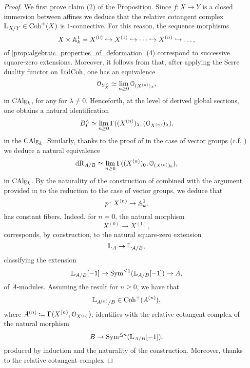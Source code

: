 \documentclass[10pt,a4paper,reqno]{amsart} %
\theoremstyle{plain}
\theoremstyle{definition}
\theoremstyle{remark}
\numberwithin{equation}{section}
\begin{document}
\begin{proof} We first prove claim (2) of the Proposition.
    Since $f \colon X \to Y$ is a closed immersion between affines we deduce that the relative cotangent complex $\mathbb L_{X/ Y} \in \mathrm{Coh}^+(X)$ is $1$-connective.
    For this reason, the sequence morphisms
        \[
            X \times \mathbb A^1_k = X^{(0)} \hookrightarrow X^{(1)} \hookrightarrow \dots \hookrightarrow X^{(n)} \hookrightarrow \dots,  
        \]
    of \cref{prop:algebraic_properties_of_deformation} (4) correspond to successive square-zero extensions.
    Moreover,
    it follows from \cite[Corollary 9.5.2.5]{Gaitsgory_Study_II} that, after applying the Serre duality functor on $\mathrm{Ind}\mathrm{Coh}$, one has an equivalence
        \[
            \mathcal O_{Y^\wedge_X} \simeq \lim_{n \ge 0} \mathcal O_{(X^{(n)})_\lambda},  
        \]
    in $\mathrm{CAlg}_k$, for any
    for $\lambda \neq 0$. Henceforth,
    at the level of derived global sections, one obtains a natural identification   
        \[
            B^\wedge_I \simeq \lim_{n \ge 0} \Gamma((X^{(n)})_\lambda, (\mathcal O_{X^{(n)}})_\lambda),  
        \]
    in the \infcat $\mathrm{CAlg}_k$. Similarly, thanks to
    the proof of \cite[\S 9, Theorem 5.1.3]{Gaitsgory_Study_II} in the case of vector groups (c.f. \cite[\S 9.5.5]{Gaitsgory_Study_II})
    we deduce a natural equivalence
        \[
            \mathrm{dR}_{A/ B} \simeq \lim_{n \ge 0}\Gamma((X^{(n)})_0, \mathcal O_{(X^{(n)})_0}),
        \]
    in $\mathrm{CAlg}_k$. By the naturality of the construction of \cite[\S 9.5.1]{Gaitsgory_Study_II} combined with the argument provided in \cite[\S 9.5.5]{Gaitsgory_Study_II} to the reduction to the case of vector groups,
    we deduce that
        \[
            p \colon X^{(n)} \to   \mathbb A^1_k,
        \]
    has constant fibers. Indeed, for $n = 0$, the natural morphism
        \[
            X^{(0)} \to X^{(1)},  
        \]
    corresponds, by construction, to the natural square-zero extension
        \[
            \mathbb L_A \to \mathbb L_{A/ B} ,  
        \]
    classifying the extension
        \[
            \mathbb L_{A/ B}[-1] \to \operatorname{Sym}^{\le 1}(\mathbb L_{A/ B}[-1])  \to A,
        \]
    of $A$-modules.
    Assuming the result for $n \ge 0$, we have that
        \[
            \mathbb L_{A^{(n)}/ B} \in \mathrm{Coh}^+(A^{(n)}),    
        \]
    where $A^{(n)} \coloneqq \Gamma(X^{(n)}, \mathcal O_{X^{(n)}})$,
    identifies with the relative cotangent complex of the natural morphism
        \[
            B \to \operatorname{Sym}^{\le n}(\mathbb L_{A/ B}[-1]),  
        \]
    produced by induction and the naturality of the construction. Moreover, thanks to \cite[\S 9.5.5]{Gaitsgory_Study_II}
    the relative cotangent complex

\end{proof}
\end{document}
